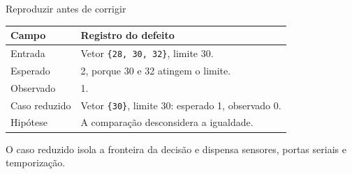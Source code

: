 \begin{frame}{Reproduzir antes de corrigir}
\small
\begin{tabularx}{\textwidth}{lX}
\toprule
Campo & Registro do defeito \\
\midrule
Entrada & Vetor \texttt{\{28, 30, 32\}}, limite 30. \\
Esperado & 2, porque 30 e 32 atingem o limite. \\
Observado & 1. \\
Caso reduzido & Vetor \texttt{\{30\}}, limite 30: esperado 1, observado 0. \\
Hipótese & A comparação desconsidera a igualdade. \\
\bottomrule
\end{tabularx}
\vspace{0.4cm}
O caso reduzido isola a fronteira da decisão e dispensa sensores, portas seriais e temporização.
\end{frame}
